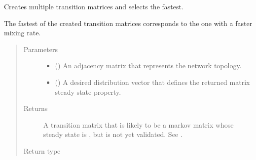 \documentclass[letterpaper,10pt,english]{sphinxmanual}
\begin{document}
\begin{fulllineitems}
\begin{fulllineitems}
\begin{quote}
\begin{description}
\end{description}\end{quote}

\end{fulllineitems}


\begin{fulllineitems}
\label{\detokenize{app.domain:app.domain.cluster_groups.SGCluster.select_fastest_topology}}
Creates multiple transition matrices and selects the fastest.

The fastest of the created transition matrices corresponds to the one
with a faster mixing rate.
\begin{quote}\begin{description}
\item[{Parameters}] \leavevmode\begin{itemize}
\item {} 
 () \textendash{} An adjacency matrix that represents the network topology.

\item {} 
 () \textendash{} A desired distribution vector that defines the returned
matrix steady state property.

\end{itemize}

\item[{Returns}] \leavevmode
A transition matrix that is likely to be a markov matrix whose
steady state is , but is not yet validated. See
{\hyperref[\detokenize{app.domain:app.domain.cluster_groups.SGCluster._validate_transition_matrix}]{}}.

\item[{Return type}] \leavevmode
{}


\end{description}
\end{quote}
\end{fulllineitems}
\end{fulllineitems}
\end{document}
